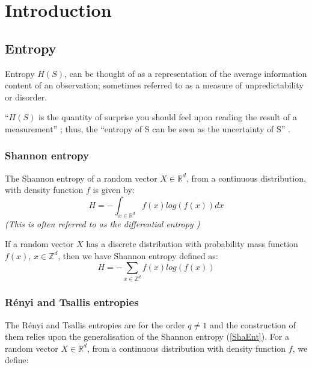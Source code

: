 \documentclass[12pt]{report}
\begin{document}

\tableofcontents

\chapter{Introduction} 

\section{Entropy}

Entropy $H(S)$, can be thought of as a representation of the average information content of an observation; sometimes referred to as a measure of unpredictability or disorder. 

``$H(S)$ is the quantity of surprise you should feel upon reading the result of a measurement'' \cite{entdef}; thus, the ``entropy of S can be seen as the uncertainty of S'' \cite{paper7}.

\subsection{Shannon entropy}
The Shannon entropy of a random vector $X \in \mathbb{R}^d$, from a continuous distribution, with density function $f$ is given by:
\begin{equation} \label{ShaEnt}
H = - \int_{x \in \mathbb{R}^d} f(x) log(f(x)) dx 
\end{equation}
\textit{(This is often referred to as the differential entropy \cite{book2})}

If a random vector $X$ has a discrete distribution with probability mass function $f(x)$, $x \in \mathbb{Z}^d$, then we have Shannon entropy defined as:
\begin{equation} 
H = - \sum_{x \in \mathbb{Z}^{d}} f(x) log(f(x)) \nonumber
\end{equation}



\subsection{R\'enyi and Tsallis entropies}
The R\'enyi and Tsallis entropies are for the order $q \neq 1$ and the construction of them relies upon the generalisation of the Shannon entropy (\ref{ShaEnt}). For a random vector $X \in \mathbb{R}^d$, from a continuous distribution with density function $f$, we define:
\end{document}
